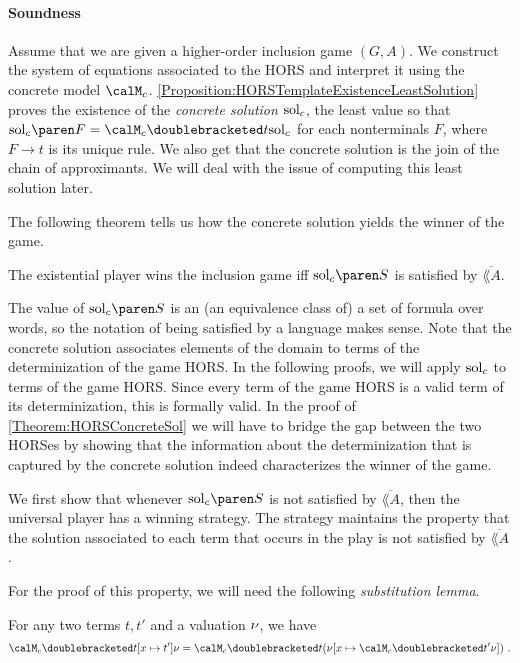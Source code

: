 \documentclass[../../diss.tex]{subfiles}
\begin{document}
\paragraph{Soundness}

Assume that we are given a higher-order inclusion game $(G,A)$.
We construct the system of equations associated to the HORS and interpret it using the concrete model $\modelc$.
\cref{Proposition:HORSTemplateExistenceLeastSolution} proves the existence of the \emph{concrete solution} $\solc$, the least value so that $\solc{F} = \semc{t}{\solc}$ for each nonterminals $F$, where $F \to t$ is its unique rule.
We also get that the concrete solution is the join of the chain of approximants.
We will deal with the issue of computing this least solution later.

The following theorem tells us how the concrete solution yields the winner of the game.

\begin{theorem}%
\label{Theorem:HORSConcreteSol}%
    The existential player wins the inclusion game iff $\solc{S}$ is satisfied by $\overline{\lang{A}}$.
\end{theorem}

The value of $\solc{S}$ is an (an equivalence class of) a set of formula over words, so the notation of being satisfied by a language makes sense.
Note that the concrete solution associates elements of the domain to terms of the determinization of the game HORS.\@
In the following proofs, we will apply $\solc$ to terms of the game HORS.\@
Since every term of the game HORS is a valid term of its determinization, this is formally valid.
In the proof of \cref{Theorem:HORSConcreteSol} we will have to bridge the gap between the two HORSes by showing that the information about the determinization that is captured by the concrete solution indeed characterizes the winner of the game.

We first show that whenever $\solc{S}$ is not satisfied by $\overline{\lang{A}}$, then the universal player has a winning strategy.
The strategy maintains the property that the solution associated to each term that occurs in the play is not satisfied by $\overline{\lang{A}}$.

For the proof of this property, we will need the following \emph{substitution lemma}.

\begin{lemma}%
\label{Lemma:HORSFPSemanticsSubstitution}%
    For any two terms $t, t'$ and a valuation $\nu$, we have
    \[
        \semc{t[x \mapsto t']}{\val}
        =
        \semc{t}{(\val[x \mapsto \semc{t'}{\val}])}
        \ .
    \]
\end{lemma}
\end{document}
